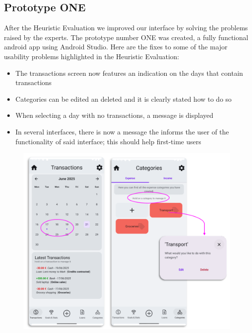 \documentclass[a4paper,12pt]{article}
\begin{document}
\subsection{Prototype ONE}
After the Heuristic Evaluation we improved our interface by solving the problems raised by the experts. The prototype number ONE was created, a fully functional android app using Android Studio. Here are the fixes to some of the major usability problems highlighted in the Heuristic Evaluation:
\begin{itemize}
    \item The transactions screen now features an indication on the days that contain transactions
    \item Categories can be edited an deleted and it is clearly stated how to do so
    \item When selecting a day with no transactions, a message is displayed
    \item In several interfaces, there is now a message the informs the user of the functionality of said interface; this should help first-time users
\end{itemize}
\begin{figure}[H]
    \centering
    \includegraphics[scale=0.6]{HEres.png}
\end{figure}
\end{document}
